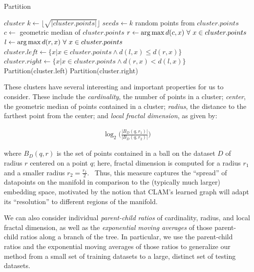 \begin{algorithm} %
\caption{Partition} %
\label{alg:clam-partition} %
\begin{algorithmic}[1] %
    \REQUIRE $cluster$
    \STATE $k \leftarrow \lfloor \sqrt{|cluster.points|} \rfloor$
    \STATE $seeds \leftarrow k$ random points from $cluster.points$
    \STATE $c \leftarrow$ geometric median of $cluster.points$
    \STATE $r \leftarrow \operatorname*{arg\,max} d(c,x) \ \forall \ x \in cluster.points$
    \STATE $l \leftarrow \operatorname*{arg\,max} d(r,x) \ \forall \ x \in cluster.points$
    \STATE $cluster.left \leftarrow \{x | x \in cluster.points \land d(l,x) \le d(r,x)\}$
    \STATE $cluster.right \leftarrow \{x | x \in cluster.points \land d(r,x) < d(l,x)\}$
        \STATE Partition(cluster.left)
    \ENDIF
        \STATE Partition(cluster.right)
    \ENDIF
\end{algorithmic}
\end{algorithm}

These clusters have several interesting and important properties for us to consider.
These include the \textit{cardinality}, the number of points in a cluster;
\textit{center}, the geometric median of points contained in a cluster;
\textit{radius}, the distance to the farthest point from the center;
and \textit{local fractal dimension},
as given by:

\begin{gather}
    \log_2\bigg(\frac{|B_D(q, r_1)|}{|B_D(q, r_2)|}\bigg)
    \label{fractal-dimension}
\end{gather}

where $B_D(q,r)$ is the set of points contained in a ball on the dataset $D$ of radius $r$ centered on a point $q$; here, fractal dimension is computed for a radius $r_1$ and a smaller radius $r_2=\frac{r_1}{2}$.~\cite{ishaq2019clustered}
Thus, this measure captures the ``spread'' of datapoints on the manifold in comparison to the (typically much larger) embedding space, motivated by the notion that CLAM's learned graph will adapt its ``resolution'' to different regions of the manifold.

We can also consider individual \textit{parent-child ratios} of cardinality, radius, and local fractal dimension, as well as the \textit{exponential moving averages} of those parent-child ratios along a branch of the tree.
In particular, we use the parent-child ratios and the exponential moving averages of those ratios to generalize our method from a small set of training datasets to a large, distinct set of testing datasets.

